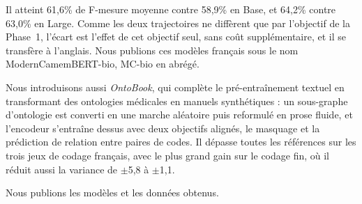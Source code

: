 Il atteint 61,6\% de F-mesure moyenne contre 58,9\% en Base, et 64,2\% contre 63,0\%
en Large. Comme les deux trajectoires ne diffèrent que par l'objectif de la Phase~1,
l'écart est l'effet de cet objectif seul, sans coût supplémentaire, et il se transfère
à l'anglais. Nous publions ces modèles français sous le nom ModernCamemBERT-bio, MC-bio en abrégé.

Nous introduisons aussi \emph{OntoBook}, qui complète le pré-entraînement textuel en
transformant des ontologies médicales en manuels synthétiques : un sous-graphe
d'ontologie est converti en une marche aléatoire puis reformulé en prose fluide, et
l'encodeur s'entraîne dessus avec deux objectifs alignés, le masquage et la prédiction
de relation entre paires de codes. Il dépasse toutes les références sur les trois jeux
de codage français, avec le plus grand gain sur le codage fin, où il réduit
aussi la variance de $\pm$5,8 à $\pm$1,1.

Nous publions les modèles et les données obtenus.
